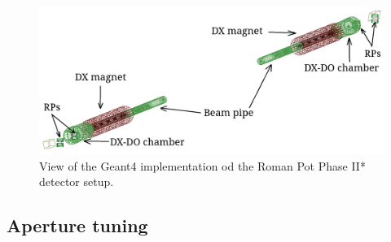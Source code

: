 \begin{figure}%
\centering\includegraphics[width=\linewidth]{graphics/rpSim/geant4plot.png}%
\caption{View of the Geant4 implementation od the Roman Pot Phase II* detector setup.}\label{fig:geant4plot}%
\end{figure}

\subsection{Aperture tuning}

